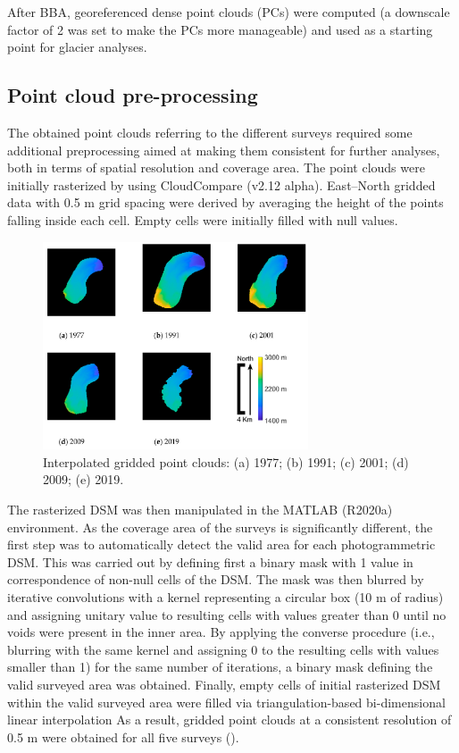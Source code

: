 After BBA, georeferenced dense point clouds (PCs) were computed (a downscale factor of 2 was set to make the PCs more manageable) and used as a starting point for glacier analyses. 


\subsection{Point cloud pre-processing}{\label{sec:2:pcd_preproc}}
The obtained point clouds referring to the different surveys required some additional preprocessing aimed at making them consistent for further analyses, both in terms of spatial resolution and coverage area.
The point clouds were initially rasterized by using CloudCompare (v2.12 alpha).
East–North gridded data with 0.5 m grid spacing were derived by averaging the height of the points falling inside each cell. 
Empty cells were initially filled with null values.

\begin{figure}[ht]
    \centering
    \includegraphics[width=0.7\textwidth]{pcd_rasterized.png}
    \caption{Interpolated gridded point clouds: (a) 1977; (b) 1991; (c) 2001; (d) 2009; (e) 2019.}
    \label{fig:2:pcd_rasterzed}
\end{figure}

The rasterized DSM was then manipulated in the MATLAB (R2020a) environment.
As the coverage area of the surveys is significantly different, the first step was to automatically detect the valid area for each photogrammetric DSM. 
This was carried out by defining first a binary mask with 1 value in correspondence of non-null cells of the DSM. 
The mask was then blurred by iterative convolutions with a kernel representing a circular box (10 m of radius) and assigning unitary value to resulting cells with values greater than 0 until no voids were present in the inner area.
By applying the converse procedure (i.e., blurring with the same kernel and assigning 0 to the resulting cells with values smaller than 1) for the same number of iterations, a binary mask defining the valid surveyed area was obtained.
Finally, empty cells of initial rasterized DSM within the valid surveyed area were filled via triangulation-based bi-dimensional linear interpolation
As a result, gridded point clouds at a consistent resolution of 0.5 m were obtained for all five surveys ().


